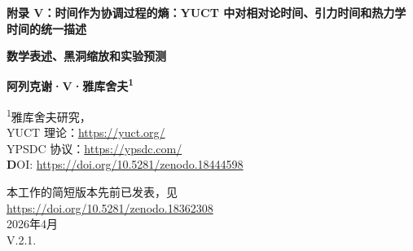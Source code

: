 \documentclass[12pt,a4paper]{article}
\newcommand{\Keff}{K_{\mathrm{eff}}}
\begin{document}
	
	\begin{titlepage}
		\begin{center}
			\vspace*{1cm}
			
			\Huge\textbf{附录 V：时间作为协调过程的熵：YUCT 中对相对论时间、引力时间和热力学时间的统一描述}
			
			\vspace{1cm}
			\Large\textbf{数学表述、黑洞缩放和实验预测}
			
			\vspace{1.5cm}
			
			\Large\textbf{阿列克谢·V·雅库舍夫\textsuperscript{1}}
			
			\vspace{0.3cm}
			\large
			\textsuperscript{1}雅库舍夫研究，\\	YUCT 理论：\url{https://yuct.org/}\\
			YPSDC 协议：\url{https://ypsdc.com/}\\
			
			\vspace{2cm}
			\textbf DOI: \url{https://doi.org/10.5281/zenodo.18444598}\\
			
			\vspace{1cm}
			
			\vspace{0cm}
			\large 
			本工作的简短版本先前已发表，见\\ \url{https://doi.org/10.5281/zenodo.18362308}\\
			\vspace{1cm}
			2026年4月 \\ \large V.2.1.
			
			\vspace{2cm}
			
			\begin{minipage}{0.9\textwidth}
				\begin{abstract}
					\noindent
					本附录在雅库舍夫统一协调理论（YUCT）框架内提出了对时间的新解释。时间被识别为协调过程的熵，通过协调效率 \(\Keff\) 量化。我们表明，狭义相对论中的洛伦兹因子 \(\gamma\) 和广义相对论中的引力时间膨胀自然地作为 \(\Keff\) 的具体形式出现。推导出了固有时 \(d\tau = dt/\Keff(v,\Phi)\) 的统一表达式，在适当的极限下回归标准公式。对于光子 (\(v=c\))，\(\Keff \to \infty\)，固有时为零，解释了光为什么不会经历时间。协调熵的量子化导致了普朗克尺度上时间的基本离散性，与量子引力相联系。
					
					我们将框架扩展到黑洞，表明时间涨落随质量的缩放遵循通用指数 \(\beta = 0.67\)。时间速率的相对不确定度缩放为 \(\delta\tau/\tau \propto M^{-0.67}\)，从而得出具体的可检验预测：(i) 黑洞吸积盘中准周期振荡（QPO）的宽度应随质量缩放为 \(\Delta\nu/\nu \propto M^{-0.67}\)；(ii) 并合黑洞振铃频率的弥散应随质量以相同规律减小。这些预测可以用现有的 X 射线数据（RXTE, NuSTAR）和引力波观测（LIGO/Virgo，未来的爱因斯坦望远镜）进行检验。该框架统一了时间的相对论、引力和热力学方面，提供了一个与通用缩放定律 \(\beta = 0.67\)（附录 L）和复杂系统的演化动力学（附录 T）一致的自洽图景。
				\end{abstract}
			\end{minipage}
			

\end{center}
\end{titlepage}
\end{document}
